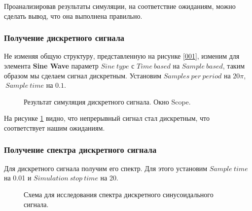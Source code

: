 \documentclass[a4paper,14pt]{extarticle}
\begin{document}
Проанализировав результаты симуляции, на соответствие ожиданиям, 
можно сделать вывод, что она выполнена правильно.

\subsubsection{Получение дискретного сигнала}

Не изменяя общую структуру, представленную на рисунке \ref{001}, 
изменим для элемента \textbf{Sine Wave} параметр $Sine \ type$ с 
$Time \ based$ на $Sample \ based$, таким образом мы сделаем 
сигнал дискретным. Установим $Samples \ per \ period$ на $20\pi$, 
$\ Sample \ time$ на $0.1$.

\begin{figure}[H]
\caption{Результат симуляция дискретного сигнала. Окно Scope.}
\label{003}
\end{figure}

На рисунке \ref{003} видно, что непрерывный сигнал стал 
дискретным, что соответствует нашим ожиданиям.

\subsubsection{Получение спектра дискретного сигнала}

Для дискретного сигнала получим его спектр. Для этого установим 
$Sample \ time$ на 0.01 и $Simulation \ stop \ time$ на 20.

\begin{figure}[H]
\caption{Схема для исследования спектра дискретного 
синусоидального сигнала.}
\label{004}
\end{figure}
\end{document}
